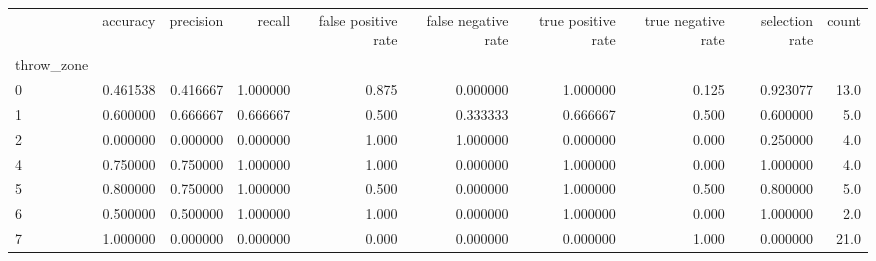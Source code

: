 \begin{tabular}{lrrrrrrrrr}
\toprule
{} &  accuracy &  precision &    recall &  false positive rate &  false negative rate &  true positive rate &  true negative rate &  selection rate &  count \\
throw\_zone &           &            &           &                      &                      &                     &                     &                 &        \\
\midrule
0          &  0.461538 &   0.416667 &  1.000000 &                0.875 &             0.000000 &            1.000000 &               0.125 &        0.923077 &   13.0 \\
1          &  0.600000 &   0.666667 &  0.666667 &                0.500 &             0.333333 &            0.666667 &               0.500 &        0.600000 &    5.0 \\
2          &  0.000000 &   0.000000 &  0.000000 &                1.000 &             1.000000 &            0.000000 &               0.000 &        0.250000 &    4.0 \\
4          &  0.750000 &   0.750000 &  1.000000 &                1.000 &             0.000000 &            1.000000 &               0.000 &        1.000000 &    4.0 \\
5          &  0.800000 &   0.750000 &  1.000000 &                0.500 &             0.000000 &            1.000000 &               0.500 &        0.800000 &    5.0 \\
6          &  0.500000 &   0.500000 &  1.000000 &                1.000 &             0.000000 &            1.000000 &               0.000 &        1.000000 &    2.0 \\
7          &  1.000000 &   0.000000 &  0.000000 &                0.000 &             0.000000 &            0.000000 &               1.000 &        0.000000 &   21.0 \\
\bottomrule
\end{tabular}
